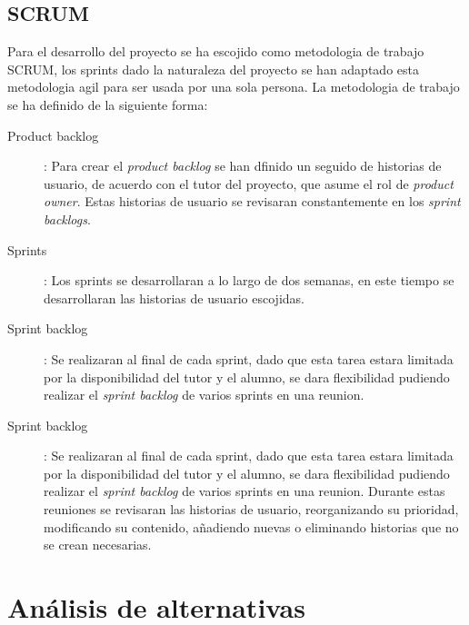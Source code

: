 \documentclass[12pt]{article} %
\begin{document}
\subsection{SCRUM}
Para el desarrollo del proyecto se ha escojido como metodologia de trabajo SCRUM, los sprints dado la naturaleza del proyecto se han adaptado esta metodologia agil para ser usada por una sola persona. La metodologia de trabajo se ha definido de la siguiente forma:
\begin{description}
	\item[Product backlog]:
	\linebreak Para crear el \textit{product backlog} se han dfinido un seguido de historias de usuario, de acuerdo con el tutor del proyecto, que asume el rol de \textit{product owner}. Estas historias de usuario se revisaran constantemente en los \textit{sprint backlogs}.
	\item[Sprints]:
	\linebreak Los sprints se desarrollaran a lo largo de dos semanas, en este tiempo se desarrollaran las historias de usuario escojidas.
	\item[Sprint backlog]:
	\linebreak Se realizaran al final de cada sprint, dado que esta tarea estara limitada por la disponibilidad del tutor y el alumno, se dara flexibilidad pudiendo realizar el \textit{sprint backlog} de varios sprints en una reunion. 
	\item[Sprint backlog]:
	\linebreak Se realizaran al final de cada sprint, dado que esta tarea estara limitada por la disponibilidad del tutor y el alumno, se dara flexibilidad pudiendo realizar el \textit{sprint backlog} de varios sprints en una reunion. Durante estas reuniones se revisaran las historias de usuario, reorganizando su prioridad, modificando su contenido, añadiendo nuevas o eliminando historias que no se crean necesarias.
\end{description}

\section{Análisis de alternativas}
\end{document}
